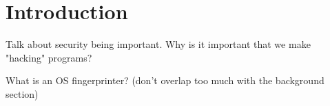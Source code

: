 \section{Introduction}
Talk about security being important. Why is it important that we make "hacking" programs?

What is an OS fingerprinter? (don't overlap too much with the background section)
